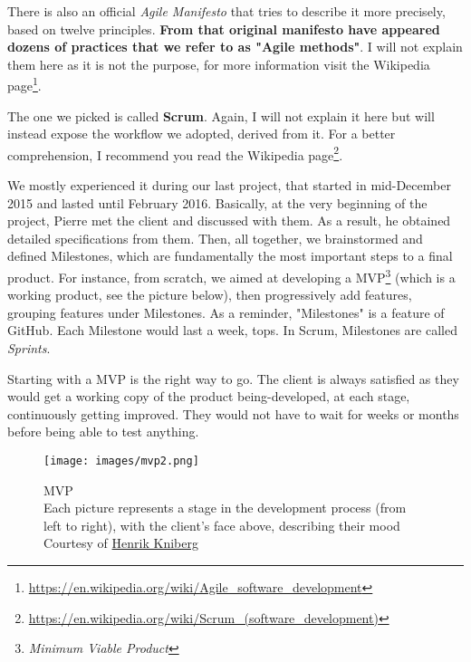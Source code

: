There is also an official \textit{Agile Manifesto} that tries to describe it more precisely, based on twelve principles. \textbf{From that original manifesto have appeared dozens of practices that we refer to as "Agile methods"}. I will not explain them here as it is not the purpose, for more information visit the Wikipedia page\footnote{\href{https://en.wikipedia.org/wiki/Agile_software_development}{https://en.wikipedia.org/wiki/Agile\_software\_development}}.

\medskip

The one we picked is called \textbf{Scrum}. Again, I will not explain it here but will instead expose the workflow we adopted, derived from it. For a better comprehension, I recommend you read the Wikipedia page\footnote{\href{https://en.wikipedia.org/wiki/Scrum_(software_development)}{https://en.wikipedia.org/wiki/Scrum\_(software\_development)}}.

\medskip

We mostly experienced it during our last project, that started in mid-December 2015 and lasted until February 2016. Basically, at the very beginning of the project, Pierre met the client and discussed with them. As a result, he obtained detailed specifications from them. Then, all together, we brainstormed and defined Milestones, which are fundamentally the most important steps to a final product. For instance, from scratch, we aimed at developing a MVP\footnote{\textit{Minimum Viable Product}} (which is a working product, see the picture below), then progressively add features, grouping features under Milestones. As a reminder, "Milestones" is a feature of GitHub. Each Milestone would last a week, tops. In Scrum, Milestones are called \textit{Sprints}.

\medskip

Starting with a MVP is the right way to go. The client is always satisfied as they would get a working copy of the product being-developed, at each stage, continuously getting improved. They would not have to wait for weeks or months before being able to test anything.

\begin{figure}[!h]
   \centering\texttt{[image: images/mvp2.png]}
   \caption[MVP]{MVP\\Each picture represents a stage in the development process (from left to right), with the client's face above, describing their mood\\Courtesy of \href{https://twitter.com/henrikkniberg/status/685474589539983360}{Henrik Kniberg}}
\end{figure}

